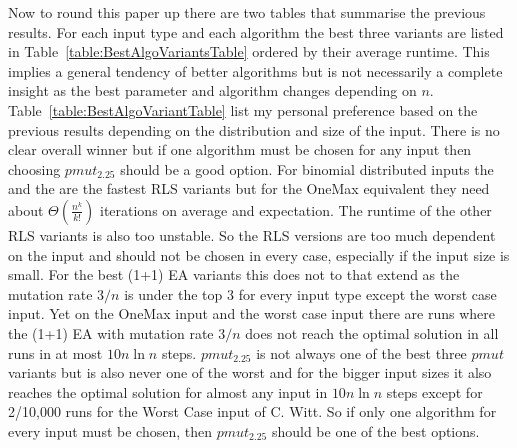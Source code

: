 Now to round this paper up there are two tables that summarise the previous results.
For each input type and each algorithm the best three variants are listed in Table~\ref{table:BestAlgoVariantsTable} ordered by their average runtime.
This implies a general tendency of better algorithms but is not necessarily a complete insight as the best parameter and algorithm changes depending on $n$.
Table~\ref{table:BestAlgoVariantTable} list my personal preference based on the previous results depending on the distribution and size of the input.
There is no clear overall winner but if one algorithm must be chosen for any input then choosing $pmut_{2.25}$ should be a good option.
For binomial distributed inputs the \RLSN[2] and the \RLSN[4] are the fastest RLS variants but for the OneMax equivalent they need about \(\Theta(\frac{n^k}{k!})\) iterations on average and expectation.
The runtime of the other RLS variants is also too unstable.
So the RLS versions are too much dependent on the input and should not be chosen in every case, especially if the input size is small.
For the best (1+1) EA variants this does not to that extend as the mutation rate $3/n$ is under the top 3 for every input type except the worst case input.
Yet on the OneMax input and the worst case input there are runs where the (1+1) EA with mutation rate $3/n$ does not reach the optimal solution in all runs in at most $10n\ln{n}$ steps.
$pmut_{2.25}$ is not always one of the best three $pmut$ variants but is also never one of the worst and for the bigger input sizes it also reaches the optimal solution for almost any input in $10n\ln{n}$ steps except for 2/10,000 runs for the Worst Case input of C. Witt.
So if only one algorithm for every input must be chosen, then $pmut_{2.25}$ should be one of the best options.

